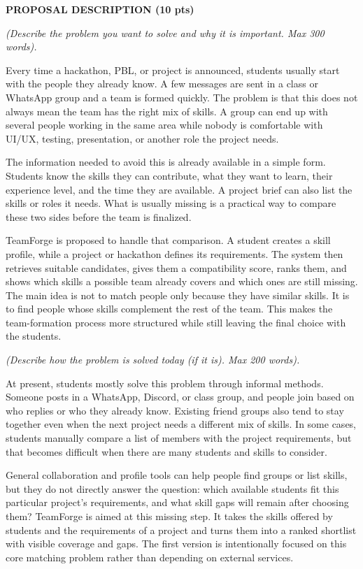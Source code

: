 \documentclass[a4paper,11pt]{article}
\newcommand{\MainHeading}[1]{{\color{GEUBlue}\fontsize{20}{23}\selectfont\bfseries #1\par}\vspace{5pt}}
\newcommand{\SubHeading}[1]{\needspace{3\baselineskip}{\color{GEUBlue}\fontsize{15.5}{18}\selectfont #1\par}\vspace{1pt}}
\newcommand{\Instruction}[1]{{\itshape #1\par}\vspace{5pt}}
\begin{document}
\MainHeading{PROPOSAL DESCRIPTION (10 pts)}
\SubHeading{Motivation (1 pt)}
\Instruction{(Describe the problem you want to solve and why it is important. Max 300 words).}
\begin{answerbox}
Every time a hackathon, PBL, or project is announced, students usually start with the people they already know. A few messages are sent in a class or WhatsApp group and a team is formed quickly. The problem is that this does not always mean the team has the right mix of skills. A group can end up with several people working in the same area while nobody is comfortable with UI/UX, testing, presentation, or another role the project needs.

The information needed to avoid this is already available in a simple form. Students know the skills they can contribute, what they want to learn, their experience level, and the time they are available. A project brief can also list the skills or roles it needs. What is usually missing is a practical way to compare these two sides before the team is finalized.

TeamForge is proposed to handle that comparison. A student creates a skill profile, while a project or hackathon defines its requirements. The system then retrieves suitable candidates, gives them a compatibility score, ranks them, and shows which skills a possible team already covers and which ones are still missing. The main idea is not to match people only because they have similar skills. It is to find people whose skills complement the rest of the team. This makes the team-formation process more structured while still leaving the final choice with the students.
\end{answerbox}
\vspace{8pt}
\SubHeading{State of the Art / Current solution (1 pt)}
\Instruction{(Describe how the problem is solved today (if it is). Max 200 words).}
\begin{answerbox}
At present, students mostly solve this problem through informal methods. Someone posts in a WhatsApp, Discord, or class group, and people join based on who replies or who they already know. Existing friend groups also tend to stay together even when the next project needs a different mix of skills. In some cases, students manually compare a list of members with the project requirements, but that becomes difficult when there are many students and skills to consider.

General collaboration and profile tools can help people find groups or list skills, but they do not directly answer the question: which available students fit this particular project's requirements, and what skill gaps will remain after choosing them? TeamForge is aimed at this missing step. It takes the skills offered by students and the requirements of a project and turns them into a ranked shortlist with visible coverage and gaps. The first version is intentionally focused on this core matching problem rather than depending on external services.
\end{answerbox}
\clearpage
\end{document}
